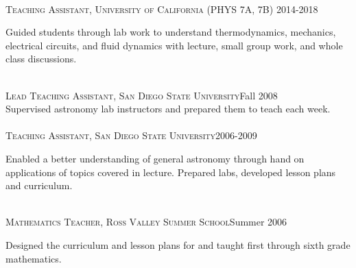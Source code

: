 \documentclass[10pt]{cv}
\begin{document}
\begin{llist}
\\
\textsc{Teaching Assistant, University of California} (PHYS 7A, 7B) \hfill 2014-2018\\
\begin{minipage}[l]{0.7\textwidth}\vspace{0.15cm}
Guided students through lab work to understand thermodynamics, mechanics, electrical circuits, and fluid dynamics with lecture, small group work, and whole class discussions.\\
\end{minipage}\vspace{0.15cm}
\\
\textsc{Lead Teaching Assistant, San Diego State University}\hfill Fall 2008\\
Supervised astronomy lab instructors and prepared them to teach each week. \\
\\
\textsc{Teaching Assistant, San Diego State University}\hfill 2006-2009\\
\begin{minipage}[l]{0.7\textwidth}\vspace{0.15cm}
Enabled a better understanding of general astronomy through hand on applications of topics covered in lecture. Prepared labs, developed lesson plans and curriculum.\\
\end{minipage}\vspace{0.15cm}
\\
\textsc{Mathematics Teacher, Ross Valley Summer School}\hfill Summer 2006\\
\begin{minipage}[l]{0.7\textwidth}\vspace{0.15cm}
Designed the curriculum and lesson plans for and taught first through sixth grade mathematics.\\

\end{minipage}
\end{llist}
\end{document}
